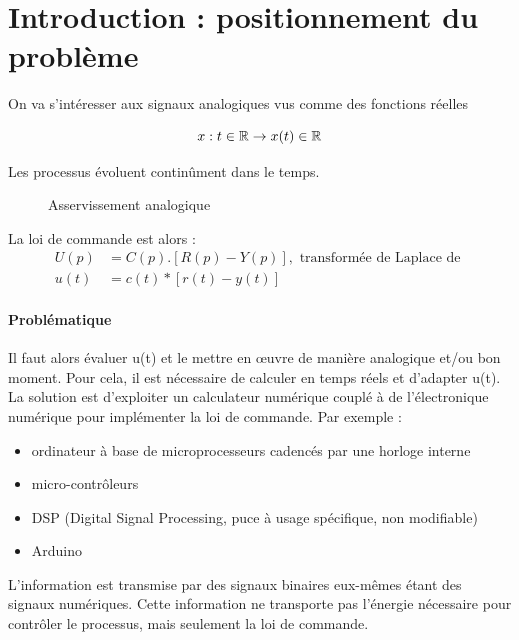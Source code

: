 \documentclass[main.tex]{subfiles}
\begin{document}
\section{Introduction : positionnement du problème}

On va s'intéresser aux signaux analogiques vus comme des fonctions réelles

\[x : t \in \mathbb{R} \rightarrow x(t) \in \mathbb{R}\]

Les processus évoluent continûment dans le temps.\\

\begin{figure}[h!]
\centering
{}
\caption{Asservissement analogique}
\end{figure}


La loi de commande est alors :
\begin{align*}
U(p) & = C(p).[R(p) - Y(p)], \text{ transformée de Laplace de }\\
u(t) & = c(t)*[r(t) - y(t)]
\end{align*}

\paragraph*{Problématique}
Il faut alors évaluer u(t) et le mettre en œuvre de manière analogique et/ou bon moment. Pour cela, il est nécessaire de calculer en temps réels et d'adapter u(t).\\

La solution est d'exploiter un calculateur numérique couplé à de l'électronique numérique pour implémenter la loi de commande.
Par exemple :
\begin{itemize}
\item ordinateur à base de microprocesseurs cadencés par une horloge interne
\item micro-contrôleurs
\item DSP (Digital Signal Processing, puce à usage spécifique, non modifiable)
\item Arduino
\end{itemize}

L'information est transmise par des signaux binaires eux-mêmes étant des signaux numériques. Cette information ne transporte pas l'énergie nécessaire pour contrôler le processus, mais seulement la loi de commande.
\end{document}
